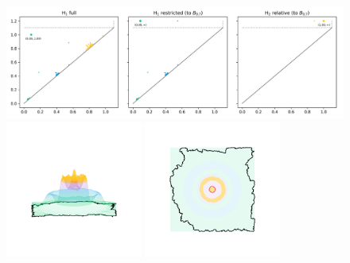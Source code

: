 \begin{figure}[htbp]
  \centering
  \includegraphics[width=\textwidth]{scripts/figures/relative/dgm-2_1.png}
  \includegraphics[trim=500 800 500 800, clip, width=0.4\textwidth]{scripts/figures/relative/surf_side-2_1.png}
  \includegraphics[trim=500 500 500 500, clip, width=0.4\textwidth]{scripts/figures/relative/surf_top-2_1.png}
\end{figure}
